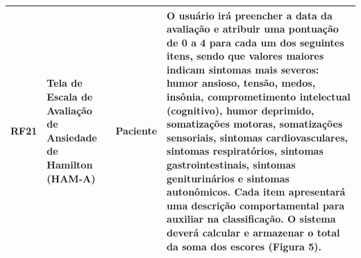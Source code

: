 \href{}{}\documentclass[12pt,portuguese,oneside]{article}
\begin{document}
\begin{table}[H]
\begin{tabularx}{\textwidth}{|>{\raggedright\arraybackslash}p{1cm}|>{\raggedright\arraybackslash}p{3cm}|>{\raggedright\arraybackslash}p{2cm}|>{\raggedright\arraybackslash}X|}
\hline
RF21 & Tela de Escala de Avaliação de Ansiedade de Hamilton (HAM-A) & Paciente & O usuário irá preencher a data da avaliação e atribuir uma pontuação de 0 a 4 para cada um dos seguintes itens, sendo que valores maiores indicam sintomas mais severos: humor ansioso, tensão, medos, insônia, comprometimento intelectual (cognitivo), humor deprimido, somatizações motoras, somatizações sensoriais, sintomas cardiovasculares, sintomas respiratórios, sintomas gastrointestinais, sintomas geniturinários e sintomas autonômicos. Cada item apresentará uma descrição comportamental para auxiliar na classificação. O sistema deverá calcular e armazenar o total da soma dos escores (Figura 5).\\
\hline
\end{tabularx}
\end{table}

\newpage
\end{document}
